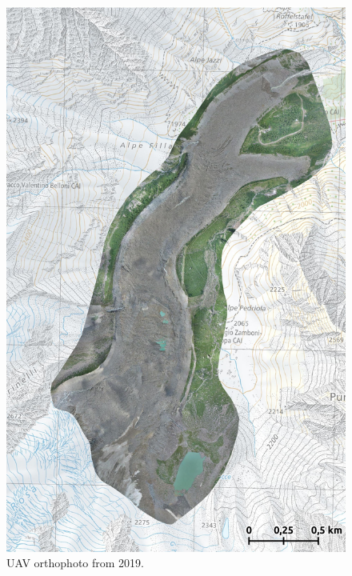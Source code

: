 \begin{figure}[p]
    \centering
    \includegraphics[height=\textheight]{figures/appendix/orto_2019.jpg}
    \caption[]{UAV orthophoto from 2019.}
\end{figure}

